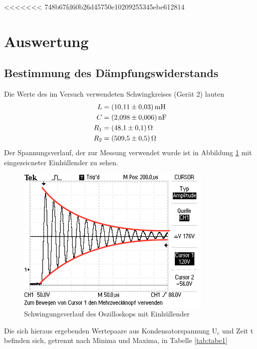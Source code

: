 <<<<<<< 748b67fd60b26d45750e10209255345ebe612814
\section{Auswertung}
\subsection{Bestimmung des Dämpfungswiderstands}
Die Werte des im Versuch verwendeten Schwingkreises (Gerät 2) lauten
\begin{align*}
  L &= \SI{10.11(3)}{\milli\henry} \\
  C &= \SI{2.098(6)}{\nano\farad} \\
  R_1 &= \SI{48.1 (1)}{\ohm} \\
  R_2 &= \SI{509.5(5)}{\ohm} \\
\end{align*}
\noindent Der Spannungsverlauf, der zur Messung verwendet wurde ist in Abbildung \ref{fig:fig1}
mit eingezeicneter Einhüllender zu sehen.
\begin{figure}[H]
  \centering
  \includegraphics[height=7cm]{Schwingung.JPG}
  \caption{Schwingungsverlauf des Oszilloskops mit Einhüllender}
  \label{fig:fig1}
\end{figure}

\noindent Die sich hieraus ergebenden Wertepaare aus Kondensatorspannung $\text{U}_c$
und Zeit t befinden sich, getrennt nach Minima und Maxima, in Tabelle \ref{tab:tabe1}



